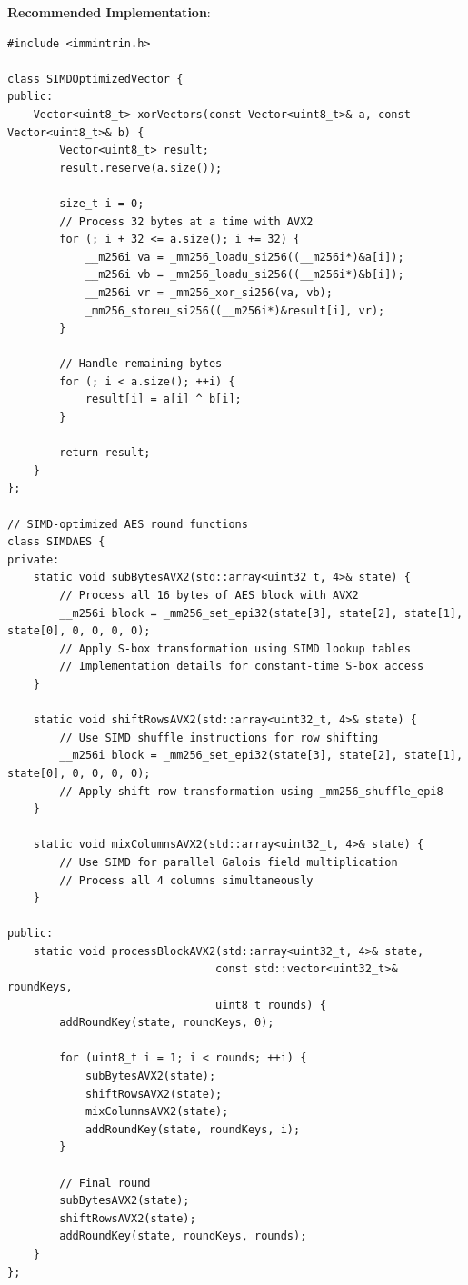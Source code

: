 \documentclass[11pt,a4paper]{article}
\begin{document}
\textbf{Recommended Implementation}:
\begin{lstlisting}
#include <immintrin.h>

class SIMDOptimizedVector {
public:
    Vector<uint8_t> xorVectors(const Vector<uint8_t>& a, const Vector<uint8_t>& b) {
        Vector<uint8_t> result;
        result.reserve(a.size());
        
        size_t i = 0;
        // Process 32 bytes at a time with AVX2
        for (; i + 32 <= a.size(); i += 32) {
            __m256i va = _mm256_loadu_si256((__m256i*)&a[i]);
            __m256i vb = _mm256_loadu_si256((__m256i*)&b[i]);
            __m256i vr = _mm256_xor_si256(va, vb);
            _mm256_storeu_si256((__m256i*)&result[i], vr);
        }
        
        // Handle remaining bytes
        for (; i < a.size(); ++i) {
            result[i] = a[i] ^ b[i];
        }
        
        return result;
    }
};

// SIMD-optimized AES round functions
class SIMDAES {
private:
    static void subBytesAVX2(std::array<uint32_t, 4>& state) {
        // Process all 16 bytes of AES block with AVX2
        __m256i block = _mm256_set_epi32(state[3], state[2], state[1], state[0], 0, 0, 0, 0);
        // Apply S-box transformation using SIMD lookup tables
        // Implementation details for constant-time S-box access
    }
    
    static void shiftRowsAVX2(std::array<uint32_t, 4>& state) {
        // Use SIMD shuffle instructions for row shifting
        __m256i block = _mm256_set_epi32(state[3], state[2], state[1], state[0], 0, 0, 0, 0);
        // Apply shift row transformation using _mm256_shuffle_epi8
    }
    
    static void mixColumnsAVX2(std::array<uint32_t, 4>& state) {
        // Use SIMD for parallel Galois field multiplication
        // Process all 4 columns simultaneously
    }

public:
    static void processBlockAVX2(std::array<uint32_t, 4>& state, 
                                const std::vector<uint32_t>& roundKeys, 
                                uint8_t rounds) {
        addRoundKey(state, roundKeys, 0);
        
        for (uint8_t i = 1; i < rounds; ++i) {
            subBytesAVX2(state);
            shiftRowsAVX2(state);
            mixColumnsAVX2(state);
            addRoundKey(state, roundKeys, i);
        }
        
        // Final round
        subBytesAVX2(state);
        shiftRowsAVX2(state);
        addRoundKey(state, roundKeys, rounds);
    }
};
\end{lstlisting}
\end{document}

